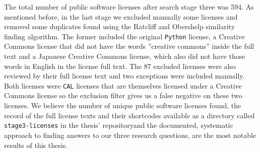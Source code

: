 The total number of public software licenses after search stage three was 594. As mentioned before, in the last stage we excluded manually some licenses and removed some duplicates found using the Ratcliff and Obershelp similarity finding algorithm. The former included the original \texttt{Python} license, a Creative Commons license that did not have the words ''creative commons'' inside the full text and a Japanese Creative Commons license, which also did not have those words in English in the license full text. The 87 excluded licenses were also reviewed by their full license text and two exceptions were included manually. Both licenses were \texttt{CAL} licenses that are themselves licensed under a Creative Commons license so the exclusion filter gives us a false negative on these two licenses. We believe the number of unique public software licenses found, the record of the full license texts and their shortcodes available as a directory called \texttt{stage3-licenses} in the thesis' repository\footnotemark[1] and the documented, systematic approach to finding answers to our three research questions, are the most notable results of this thesis.
